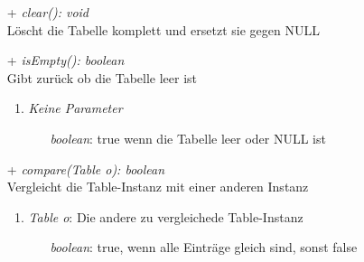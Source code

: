 \begin{itemize}
	\item[+] \textit{clear(): void} \\
	Löscht die Tabelle komplett und ersetzt sie gegen NULL
	
	\item[+] \textit{isEmpty(): boolean} \\
	Gibt zurück ob die Tabelle leer ist
	\begin{enumerate}
		\item \textit{Keine Parameter}
		\begin{itemize}
			\item[] \textit{boolean}: true wenn die Tabelle leer oder NULL ist
		\end{itemize}
	\end{enumerate}

	\item[+] \textit{compare(Table o): boolean} \\
	Vergleicht die Table-Instanz mit einer anderen Instanz
	\begin{enumerate}
		\item \textit{Table o}: Die andere zu vergleichede Table-Instanz
		\begin{itemize}
			\item[] \textit{boolean}: true, wenn alle Einträge gleich sind, sonst false
		\end{itemize}
	\end{enumerate}
\end{itemize}